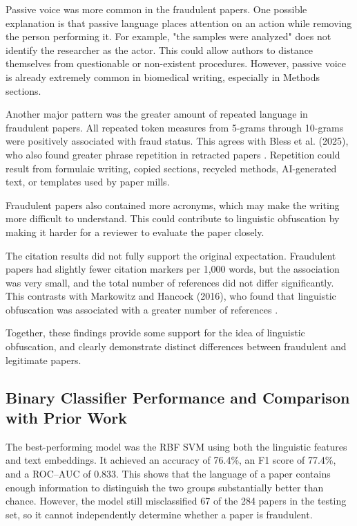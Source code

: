 \documentclass[11pt,letterpaper]{article}
\begin{document}
Passive voice was more common in the fraudulent papers. One possible explanation is that passive language places attention on an action while removing the person performing it. For example, "the samples were analyzed" does not identify the researcher as the actor. This could allow authors to distance themselves from questionable or non-existent procedures. However, passive voice is already extremely common in biomedical writing, especially in Methods sections.

Another major pattern was the greater amount of repeated language in fraudulent papers. All repeated token measures from 5-grams through 10-grams were positively associated with fraud status. This agrees with Bless et al. (2025), who also found greater phrase repetition in retracted papers \cite{bless2025}. Repetition could result from formulaic writing, copied sections, recycled methods, AI-generated text, or templates used by paper mills.

Fraudulent papers also contained more acronyms, which may make the writing more difficult to understand. This could contribute to linguistic obfuscation by making it harder for a reviewer to evaluate the paper closely. 

The citation results did not fully support the original expectation. Fraudulent papers had slightly fewer citation markers per 1,000 words, but the association was very small, and the total number of references did not differ significantly. This contrasts with Markowitz and Hancock (2016), who found that linguistic obfuscation was associated with a greater number of references \cite{markowitz2016}. 

Together, these findings provide some support for the idea of linguistic obfuscation, and clearly demonstrate distinct differences between fraudulent and legitimate papers.

\subsection{Binary Classifier Performance and Comparison with Prior Work}

The best-performing model was the RBF SVM using both the linguistic features and text embeddings. It achieved an accuracy of 76.4\%, an F1 score of 77.4\%, and a ROC--AUC of 0.833. This shows that the language of a paper contains enough information to distinguish the two groups substantially better than chance. However, the model still misclassified 67 of the 284 papers in the testing set, so it cannot independently determine whether a paper is fraudulent.
\end{document}

